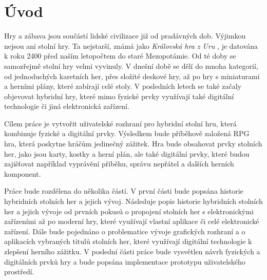 \chapter{Úvod}
Hry a zábava jsou součástí lidské civilizace již od pradávných dob. Výjimkou nejsou ani stolní hry. Ta nejstarší, známá jako \textit{Královská hra z Uru} \cite{royal_game_of_ur}, je datována k roku 2400 před naším letopočtem do staré Mezopotámie. Od té doby se samozřejmě stolní hry velmi vyvinuly. V dnešní době se dělí do mnoha kategorií, od jednoduchých karetních her, přes složité deskové hry, až po hry s miniaturami a herními plány, které zabírají celé stoly. V posledních letech se také začaly objevovat hybridní hry, které mimo fyzické prvky využívají také digitální technologie či jiná elektronická zařízení.

Cílem práce je vytvořit uživatelské rozhraní pro hybridní stolní hru, která kombinuje fyzické a digitální prvky. Výsledkem bude příběhově založená RPG hra, která poskytne hráčům jedinečný zážitek. Hra bude obsahovat prvky stolních her, jako jsou karty, kostky a herní plán, ale také digitální prvky, které budou zajišťovat například vyprávění příběhu, správu nepřátel a dalších herních komponent.

Práce bude rozdělena do několika částí. V první části bude popsána historie hybridních stolních her a jejich vývoj. Následuje popis historie hybridních stolních her a jejich vývoje od prvních pokusů o propojení stolních her s elektronickými zařízeními až po moderní hry, které využívají vlastní aplikace či celé elektronické zařízení. Dále bude pojednáno o problematice vývoje grafických rozhraní a o aplikacích vybraných titulů stolních her, které využívají digitální technologie k zlepšení herního zážitku. V poslední části práce bude vysvětlen návrh fyzických a digitálních prvků hry a bude popsána implementace prototypu uživatelského prostředí.